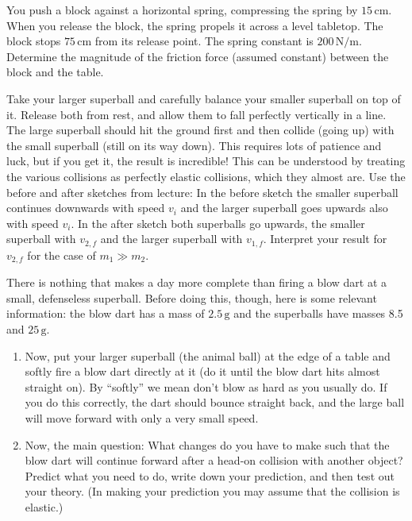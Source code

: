 \begin{exercise}
  You push a block against a horizontal spring, compressing the spring
  by $15\,\text{cm}$.  When you release the block, the spring propels
  it across a level tabletop.  The block stops $75\,\text{cm}$ from
  its release point.  The spring constant is $200\,\text{N/m}$.
  Determine the magnitude of the friction force (assumed constant)
  between the block and the table.
\end{exercise}



\begin{exercise}
  Take your larger superball and carefully balance your smaller
  superball on top of it.  Release both from rest, and allow them to
  fall perfectly vertically in a line.  The large superball should hit
  the ground first and then collide (going up) with the small
  superball (still on its way down).  This requires lots of patience
  and luck, but if you get it, the result is incredible!  This can be
  understood by treating the various collisions as perfectly elastic
  collisions, which they almost are.  
  Use the before and after sketches from lecture: In the before sketch the smaller superball continues downwards with speed $v_i$ and the larger superball goes upwards also with speed $v_i$. In the after sketch both superballs go upwards, the smaller superball with $v_{2,f}$ and the larger superball with $v_{1,f}$. Interpret your result for $v_{2,f}$ for the case of $m_1 \gg m_2$.
\end{exercise}



\begin{exercise}
  There is nothing that makes a day more complete than firing a blow
  dart at a small, defenseless superball.  Before doing this, though,
  here is some relevant information: the blow dart has a mass of
  $2.5\,\text{g}$ and the superballs have masses 8.5\, and 
  $25\,\text{g}$.
  \begin{enumerate}
  \item Now, put your larger superball (the animal ball) at the
    edge of a table and softly fire a blow dart directly at it (do it
    until the blow dart hits almost straight on).  By ``softly'' we
    mean don't blow as hard as you usually do.  If you do this
    correctly, the dart should bounce straight back, and the large
    ball will move forward with only a very small speed.

  \item Now, the main question: What changes do you have to make such
    that the blow dart will continue forward after a head-on collision
    with another object?  Predict what you need to do, write down your
    prediction, and then test out your theory.  (In making your 
    prediction you may assume that the collision is elastic.)
  \end{enumerate}
  \label{prob:blow_dart_superball}
\end{exercise}

